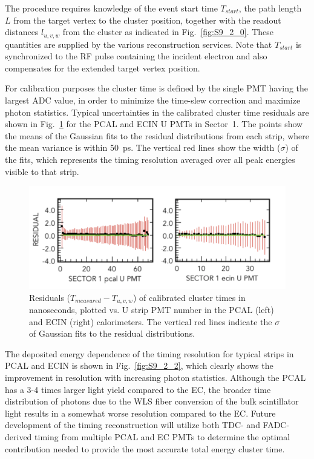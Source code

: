 The procedure requires knowledge of the event start time $T_{start}$, the path length $L$ from the target vertex
to the cluster position, together with the readout distances $l_{u,v,w}$ from the cluster as indicated in
Fig.~\ref{fig:S9_2_0}. These quantities are supplied by the various reconstruction services. Note that $T_{start}$
is synchronized to the RF pulse containing the incident electron and also compensates for the extended target
vertex position.

For calibration purposes the cluster time is defined by the single PMT having the largest ADC value, in order to
minimize the time-slew correction and maximize photon statistics. Typical uncertainties in the calibrated cluster
time residuals are shown in Fig.~\ref{fig:S9_2_1} for the PCAL and ECIN U PMTs in Sector~1. The points show the
means of the Gaussian fits to the residual distributions from each strip, where the mean variance is within 50~ps.
The vertical red lines show the width ($\sigma$) of the fits, which represents the timing resolution averaged over
all peak energies visible to that strip.  

\begin{figure}[hbt]
\centering
\includegraphics[width=1.0\columnwidth,keepaspectratio]{img/S9_2_1.png}
\caption[]{Residuals ($T_{measured}-T_{u,v,w}$) of calibrated cluster times in nanoseconds, plotted vs. U strip
  PMT number in the PCAL (left) and ECIN (right) calorimeters. The vertical red lines indicate the $\sigma$ of
  Gaussian fits to the residual distributions.}  
\label{fig:S9_2_1}
\end{figure}

The deposited energy dependence of the timing resolution for typical strips in PCAL and ECIN is shown in
Fig.~\ref{fig:S9_2_2}, which clearly shows the improvement in resolution with increasing photon statistics.
Although the PCAL has a 3-4 times larger light yield compared to the EC, the broader time distribution of photons
due to the WLS fiber conversion of the bulk scintillator light results in a somewhat worse resolution compared to
the EC. Future development of the timing reconstruction will utilize both TDC- and FADC-derived timing from
multiple PCAL and EC PMTs to determine the optimal contribution needed to provide the most accurate total
energy cluster time.

